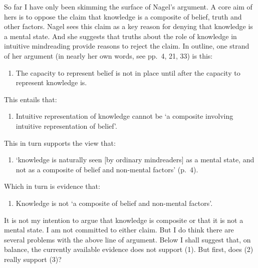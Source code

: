 \documentclass[11pt,a4paper]{extarticle}
\begin{document}
So far I have only been skimming the surface of Nagel's argument.
A core aim of hers is to oppose the claim that knowledge is a composite of belief, truth and other factors.
Nagel sees this claim as a key reason for denying that knowledge is a mental state.
And she suggests that truths about the role of knowledge in intuitive mindreading provide reasons to reject the claim.
In outline, one strand of her argument (in nearly her own words, see pp.\ 4, 21, 33) is this:
%
\begin{enumerate}
\item The capacity to represent belief is not in place until after the capacity to represent knowledge is.
\end{enumerate}
This entails that:
\begin{enumerate}[resume]
\item Intuitive representation of knowledge cannot be `a composite involving intuitive representation of belief'.
\end{enumerate}
This in turn supports the view  that:
\begin{enumerate}[resume]
\item `knowledge is naturally seen [by ordinary mindreaders] as a mental state, and not as a composite of belief and non-mental factors' (p.\ 4).
\end{enumerate}
Which in turn is evidence that:
\begin{enumerate}[resume]
\item Knowledge is not `a composite of belief and non-mental factors'.
\end{enumerate}
%
It is not my intention to argue that knowledge is composite or that it is not a mental state.
I am not committed to either claim.
But I do think there are several problems with the above line of argument.
Below I shall suggest that, on balance, the currently available evidence does not support (1).  
But first, does (2) really support (3)?
\end{document}
